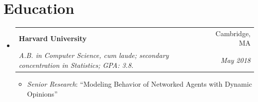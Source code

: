 \documentclass[letterpaper,11pt]{article}
\makeatletter
\newcommand{\resumeSubheading}[4]{
  \needspace{5\baselineskip}\item
  \begin{tabular*}{\linewidth}{l@{\extracolsep{\fill}}r}
    \textbf{#1} & #2 \\
    \textit{\small #3} & \textit{\small #4} \\
  \end{tabular*}
}
\newcommand{\resumeDetail}[2]{\item\small{\textit{#1}: #2}}
\newcommand{\resumeSubHeadingListStart}{\begin{itemize}[leftmargin=0pt,label={},itemsep=5pt,topsep=0pt,parsep=0pt]}
\newcommand{\resumeSubHeadingListEnd}{\end{itemize}}
\newcommand{\resumeDetailListStart}{\begin{itemize}[leftmargin=0pt,label={},itemsep=3pt,topsep=3pt,parsep=0pt]}
\newcommand{\resumeDetailListEnd}{\end{itemize}}
\makeatother
\begin{document}
\section{Education}
\resumeSubHeadingListStart
  \resumeSubheading
    {Harvard University}{Cambridge, MA}
    {A.B. in Computer Science, cum laude; secondary concentration in Statistics; GPA: 3.8.}{May 2018}
  \resumeDetailListStart
    \resumeDetail{Senior Research}{``Modeling Behavior of Networked Agents with Dynamic Opinions''}
  \resumeDetailListEnd
\resumeSubHeadingListEnd
\end{document}

